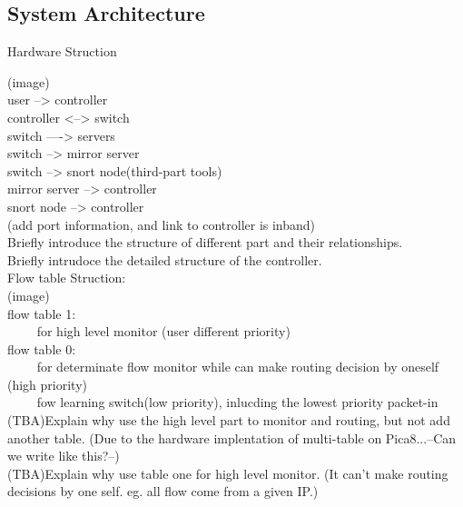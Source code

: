 \documentclass{acm_proc_article-sp}
\begin{document}
\subsection{System Architecture}
Hardware Struction

(image)\\
             user --> controller\\
             controller <--> switch\\
             switch ----> servers\\
             switch --> mirror server\\
             switch --> snort node(third-part tools)\\
             mirror server --> controller\\
             snort node --> controller\\
             (add port information, and link to controller is inband)\\


Briefly introduce the structure of different part and their relationships.\\
Briefly intrudoce the detailed structure of the controller.\\
Flow table Struction:\\
(image)\\
            flow table 1:\\
            ~~~~ for high level monitor (user different priority)\\
            flow table 0:\\
            ~~~~ for determinate flow monitor while can make routing decision by oneself (high priority)\\
            ~~~~ fow learning switch(low priority), inlucding the lowest priority packet-in\\

(TBA)Explain why use the high level part to monitor and routing, but not add another table. (Due to the hardware implentation of multi-table on Pica8...--Can we write like this?--)\\
(TBA)Explain why use table one for high level monitor. (It can't make routing decisions by one self. eg. all flow come from a given IP.)\\
\end{document}
